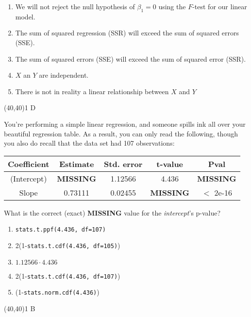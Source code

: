 \documentclass[addpoints]{exam}
\def\solutions{0}
\begin{document}
{\begin{questions}
\begin{minipage}[b]{.85\textwidth}
	\begin{enumerate}[label=\Alph*.]
		\item We will not reject the null hypothesis of $\beta_1=0$ using the $F$-test for our linear model.
		\item The sum of squared regression (SSR) will exceed the sum of squared errors (SSE).
		\item The sum of squared errors (SSE) will exceed the sum of squared error (SSR).
		\item $X$ an $Y$ are independent.
		\item There is not in reality a linear relationship between $X$ and $Y$
	\end{enumerate}
\end{minipage}
\begin{minipage}[b]{.1\textwidth}
	\vspace{\fill}\framebox(40,40){\if\solutions1 D \fi}
\end{minipage}
\vspace{3mm}

\clearpage
\question[3] You're performing a simple linear regression, and someone spills ink all over your beautiful regression table.  As a result, you can only read the following, though you also do recall that the data set had 107 observations:\\
\begin{tabular}{|c|c|c|c|c|} \hline
	Coefficient & Estimate & Std. error & t-value & Pval\\ \hline
	(Intercept)& \textbf{MISSING} & 1.12566& 4.436 & \textbf{MISSING} \\
	Slope& 0.73111 &0.02455& \textbf{MISSING}& $<$ 2e-16 \\ \hline
\end{tabular}

What is the correct (exact) \textbf{MISSING} value for the \textit{intercept}'s p-value? \\

\vspace{2mm}
\begin{minipage}[b]{.85\textwidth}
	\begin{enumerate}[label=\Alph*.]
		\item \texttt{stats.t.ppf(4.436, df=107)}
		\item 2(1-\texttt{stats.t.cdf(4.436, df=105)})
		\item $1.12566 \cdot 4.436$
		\item 2(1-\texttt{stats.t.cdf(4.436, df=107)})
		\item (1-\texttt{stats.norm.cdf(4.436)})
	\end{enumerate}
\end{minipage}
\begin{minipage}[b]{.1\textwidth}
	\vspace{\fill}\framebox(40,40){\if\solutions1 B \fi}
\end{minipage}


\end{questions}}
\end{document}
